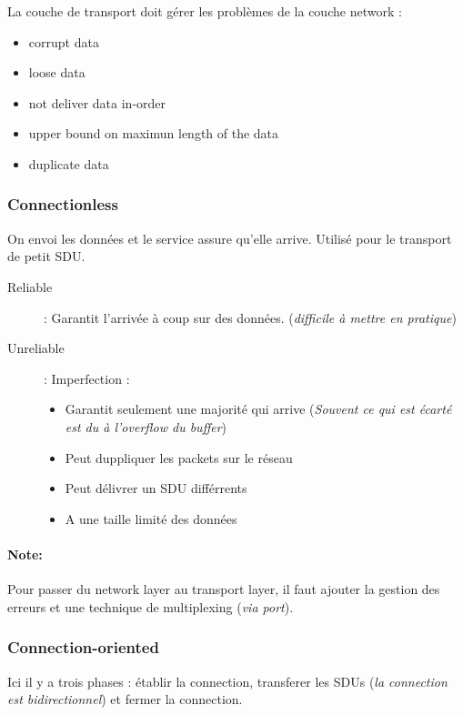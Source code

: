 La couche de transport doit gérer les problèmes de la couche network :
\begin{itemize}
    \item corrupt data
    \item loose data
    \item not deliver data in-order
    \item upper bound on maximun length of the data
    \item duplicate data
\end{itemize}

\subsubsection{Connectionless}
On envoi les données et le service assure qu'elle arrive.
Utilisé pour le transport de petit SDU.

\begin{description}
    \item[Reliable] : Garantit l'arrivée à coup sur des données. (\textit{difficile à mettre en pratique})
    \item[Unreliable] : Imperfection :
        \begin{itemize}
            \item Garantit seulement une majorité qui arrive (\textit{Souvent ce qui est écarté est du à l'overflow du buffer})
            \item Peut duppliquer les packets sur le réseau
            \item Peut délivrer un SDU différrents
            \item A une taille limité des données
        \end{itemize}
\end{description}

\paragraph{Note:} Pour passer du network layer au transport layer, il faut ajouter la
gestion des erreurs et une technique de multiplexing (\textit{via port}).


\subsubsection{Connection-oriented}
Ici il y a trois phases : établir la connection, transferer les SDUs (\textit{la connection est
bidirectionnel}) et fermer la connection.

